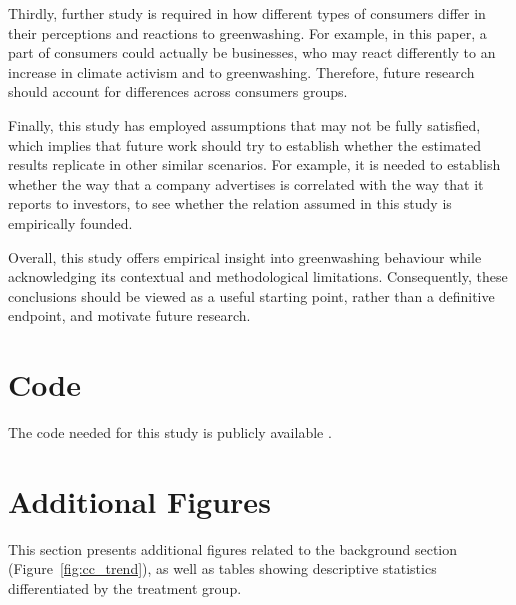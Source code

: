 \documentclass[12pt]{article}
\begin{document}
Thirdly, further study is required in how different types of consumers differ in their perceptions and reactions to greenwashing. For example, in this paper, a part of consumers could actually be businesses, who may react differently to an increase in climate activism and to greenwashing. Therefore, future research should account for differences across consumers groups. 

Finally, this study has employed assumptions that may not be fully satisfied, which implies that future work should try to establish whether the estimated results replicate in other similar scenarios. For example, it is needed to establish whether the way that a company advertises is correlated with the way that it reports to investors, to see whether the relation assumed in this study is empirically founded. 

Overall, this study offers empirical insight into greenwashing behaviour while acknowledging its contextual and methodological limitations. Consequently, these conclusions should be viewed as a useful starting point, rather than a definitive endpoint, and motivate future research.



\pagebreak
\printbibliography{}
\pagebreak
\appendix

\section{Code}

The code needed for this study is publicly available \href{https://github.com/pszewi/thesis}{}.

\renewcommand\thetable{\thesection.\arabic{table}}
\renewcommand\thefigure{\thesection.\arabic{figure}}
\setcounter{table}{0}
\setcounter{figure}{0}

\section{Additional Figures}\label{app:extra_figs}



This section presents additional figures related to the background section (Figure~\ref{fig:cc_trend}), as well as tables showing descriptive statistics differentiated by the treatment group.
\end{document}

